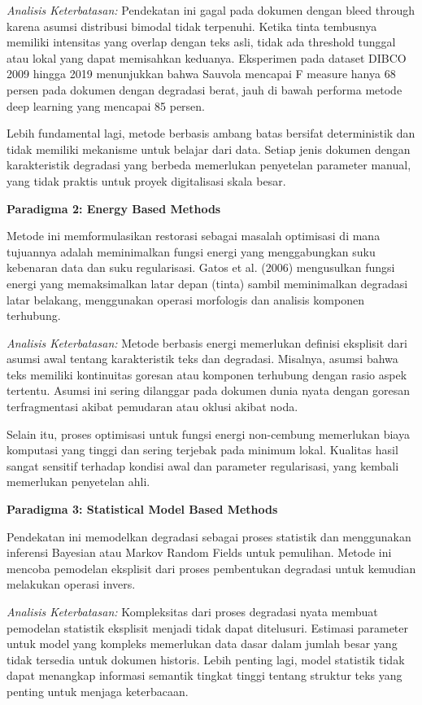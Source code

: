 \documentclass[12pt,a4paper]{article}
\begin{document}
\textit{Analisis Keterbatasan:} Pendekatan ini gagal pada dokumen dengan bleed through karena asumsi distribusi bimodal tidak terpenuhi. Ketika tinta tembusnya memiliki intensitas yang overlap dengan teks asli, tidak ada threshold tunggal atau lokal yang dapat memisahkan keduanya. Eksperimen pada dataset DIBCO 2009 hingga 2019 menunjukkan bahwa Sauvola mencapai F measure hanya 68 persen pada dokumen dengan degradasi berat, jauh di bawah performa metode deep learning yang mencapai 85 persen.

Lebih fundamental lagi, metode berbasis ambang batas bersifat deterministik dan tidak memiliki mekanisme untuk belajar dari data. Setiap jenis dokumen dengan karakteristik degradasi yang berbeda memerlukan penyetelan parameter manual, yang tidak praktis untuk proyek digitalisasi skala besar.

\textbf{Paradigma 2: Energy Based Methods}

Metode ini memformulasikan restorasi sebagai masalah optimisasi di mana tujuannya adalah meminimalkan fungsi energi yang menggabungkan suku kebenaran data dan suku regularisasi. Gatos et al. (2006) mengusulkan fungsi energi yang memaksimalkan latar depan (tinta) sambil meminimalkan degradasi latar belakang, menggunakan operasi morfologis dan analisis komponen terhubung.

\textit{Analisis Keterbatasan:} Metode berbasis energi memerlukan definisi eksplisit dari asumsi awal tentang karakteristik teks dan degradasi. Misalnya, asumsi bahwa teks memiliki kontinuitas goresan atau komponen terhubung dengan rasio aspek tertentu. Asumsi ini sering dilanggar pada dokumen dunia nyata dengan goresan terfragmentasi akibat pemudaran atau oklusi akibat noda.

Selain itu, proses optimisasi untuk fungsi energi non-cembung memerlukan biaya komputasi yang tinggi dan sering terjebak pada minimum lokal. Kualitas hasil sangat sensitif terhadap kondisi awal dan parameter regularisasi, yang kembali memerlukan penyetelan ahli.

\textbf{Paradigma 3: Statistical Model Based Methods}

Pendekatan ini memodelkan degradasi sebagai proses statistik dan menggunakan inferensi Bayesian atau Markov Random Fields untuk pemulihan. Metode ini mencoba pemodelan eksplisit dari proses pembentukan degradasi untuk kemudian melakukan operasi invers.

\textit{Analisis Keterbatasan:} Kompleksitas dari proses degradasi nyata membuat pemodelan statistik eksplisit menjadi tidak dapat ditelusuri. Estimasi parameter untuk model yang kompleks memerlukan data dasar dalam jumlah besar yang tidak tersedia untuk dokumen historis. Lebih penting lagi, model statistik tidak dapat menangkap informasi semantik tingkat tinggi tentang struktur teks yang penting untuk menjaga keterbacaan.
\end{document}
